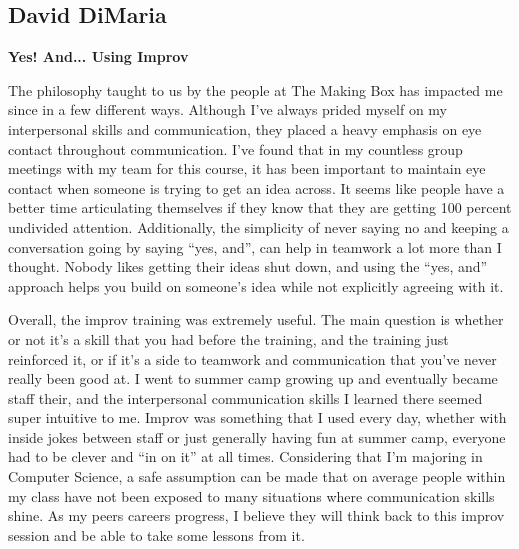 \documentclass[12pt,letterpaper]{article}
\begin{document}
\subsection{David DiMaria}
\textbf{Yes! And... Using Improv}\par
The philosophy taught to us by the people at The Making Box has impacted me since in a few different ways. Although I’ve always prided myself on my interpersonal skills and communication, they placed a heavy emphasis on eye contact throughout communication. I’ve found that in my countless group meetings with my team for this course, it has been important to maintain eye contact when someone is trying to get an idea across. It seems like people have a better time articulating themselves if they know that they are getting 100 percent undivided attention. Additionally, the simplicity of never saying no and keeping a conversation going by saying “yes, and”, can help in teamwork a lot more than I thought. Nobody likes getting their ideas shut down, and using the “yes, and” approach helps you build on someone’s idea while not explicitly agreeing with it.\par
	Overall, the improv training was extremely useful. The main question is whether or not it’s a skill that you had before the training, and the training just reinforced it, or if it’s a side to teamwork and communication that you’ve never really been good at. I went to summer camp growing up and eventually became staff their, and the interpersonal communication skills I learned there seemed super intuitive to me. Improv was something that I used every day, whether with inside jokes between staff or just generally having fun at summer camp, everyone had to be clever and “in on it” at all times. Considering that I’m majoring in Computer Science, a safe assumption can be made that on average people within my class have not been exposed to many situations where communication skills shine. As my peers careers progress, I believe they will think back to this improv session and be able to take some lessons from it.

\clearpage
\end{document}
